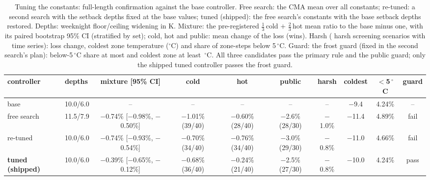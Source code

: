 \begin{table}[t]
\caption{Tuning the constants: full-length confirmation against the base controller. Free search: the CMA mean over all \RTwNParams{} constants; re-tuned: a second search with the setback depths fixed at the base values; tuned (shipped): the free search's constants with the base setback depths restored. Depths: weeknight floor/ceiling widening in K. Mixture: the pre-registered $\tfrac13$\,cold $+$ $\tfrac23$\,hot mean ratio to the base minus one, with its paired bootstrap 95\% CI (stratified by set); cold, hot and public: mean change of the loss (wins). Harsh (\RTwNHS{} harsh screening scenarios with time series): loss change, coldest zone temperature ($^\circ$C) and share of zone-steps below 5\,$^\circ$C. Guard: the frost guard (fixed in the second search's plan): below-5\,$^\circ$C share at most \RTwGuardBelowFiveLim{} and coldest zone at least \RTwGuardColdestLim\,$^\circ$C. All three candidates pass the primary rule and the public guard; only the shipped tuned controller passes the frost guard.}
\label{tab:tuning13}
\centering\scriptsize
\setlength{\tabcolsep}{1.5pt}
\begin{tabular}{@{}llcccccccc@{}}
\toprule
controller & depths & mixture [95\% CI] & cold & hot & public & harsh & coldest & $<$5\,$^\circ$C & guard \\
\midrule
base & 10.0/6.0 & -- & -- & -- & -- & -- & $-$9.4 & 4.24\% & -- \\
free search & 11.5/7.9 & $-$0.74\% [$-$0.98\%, $-$0.50\%] & $-$1.01\% (39/40) & $-$0.60\% (28/40) & $-$2.6\% (28/30) & $-$1.0\% & $-$11.4 & 4.89\% & fail \\
re-tuned & 10.0/6.0 & $-$0.74\% [$-$0.93\%, $-$0.54\%] & $-$0.70\% (34/40) & $-$0.76\% (34/40) & $-$3.0\% (29/30) & $-$0.8\% & $-$11.0 & 4.66\% & fail \\
\textbf{tuned (shipped)} & 10.0/6.0 & $-$0.39\% [$-$0.65\%, $-$0.12\%] & $-$0.68\% (36/40) & $-$0.24\% (21/40) & $-$2.5\% (27/30) & $-$0.8\% & $-$10.0 & 4.24\% & pass \\
\bottomrule
\end{tabular}
\end{table}

